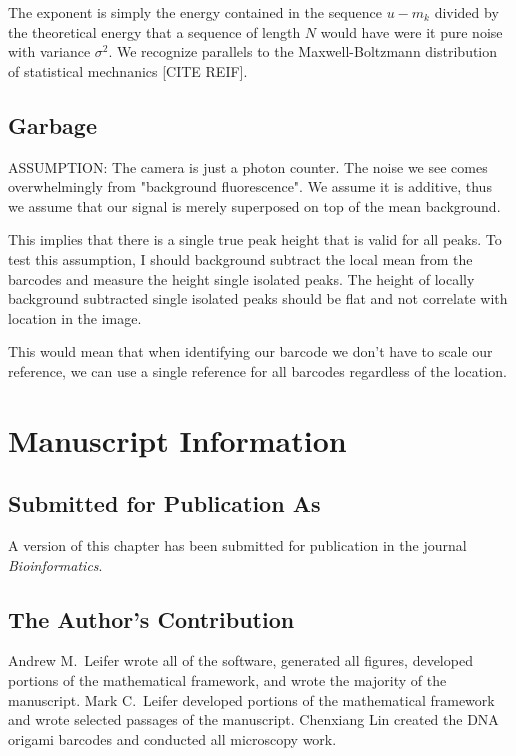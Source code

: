 The exponent is simply the energy contained in the sequence $u-m_k$ divided by the
theoretical energy that a sequence of length $N$ would have were it pure noise with variance $\sigma^2$. We recognize parallels to the Maxwell-Boltzmann distribution of statistical
mechnanics [CITE REIF].  














\subsection{Garbage	} 

ASSUMPTION: The camera is just a photon counter. The noise we see comes overwhelmingly from "background fluorescence". We assume it is additive, thus we assume that our signal is merely superposed on top of the mean background. 

This implies that there is a single true peak height that is valid for all peaks. To test this assumption, I should background subtract the local mean from the barcodes and measure the height single isolated peaks. The height of locally background subtracted single isolated peaks should be flat and not correlate with location in the image.

This would mean that when identifying our barcode we don't have to scale our reference, we can use a single reference for all barcodes regardless of the location.


\section{Manuscript Information}
\subsection{Submitted for Publication As}
A version of this chapter has been submitted for publication in the journal \textit{Bioinformatics}.

\subsection{The Author's Contribution}
Andrew M.~Leifer wrote all of the software, generated all figures, developed portions of the mathematical framework, and wrote the majority of the manuscript. Mark C.~Leifer developed portions of the mathematical framework and wrote selected passages of the manuscript. Chenxiang Lin created the DNA origami barcodes and conducted all microscopy work. 
 
